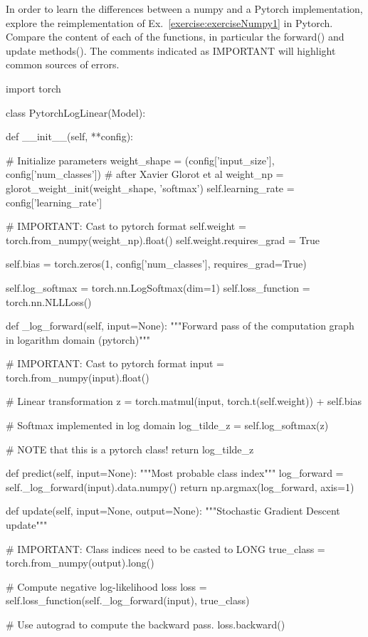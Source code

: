 \begin{exercise}
\label{exercisePytorch1}
In order to learn the differences between a numpy and a Pytorch implementation, explore the reimplementation of Ex.~\ref{exercise:exerciseNumpy1} in Pytorch. Compare the content of each of the functions, in particular the forward() and update methods(). The comments indicated as IMPORTANT will highlight common sources of errors.
\begin{python}
import torch


class PytorchLogLinear(Model):

	def __init__(self, **config):

		# Initialize parameters
		weight_shape = (config['input_size'], config['num_classes'])
		# after Xavier Glorot et al
		weight_np = glorot_weight_init(weight_shape, 'softmax')
		self.learning_rate = config['learning_rate']

		# IMPORTANT: Cast to pytorch format
		self.weight = torch.from_numpy(weight_np).float()
		self.weight.requires_grad = True

		self.bias = torch.zeros(1, config['num_classes'], requires_grad=True)

		self.log_softmax = torch.nn.LogSoftmax(dim=1)
		self.loss_function = torch.nn.NLLLoss()

	def _log_forward(self, input=None):
		"""Forward pass of the computation graph in logarithm domain (pytorch)"""

		# IMPORTANT: Cast to pytorch format
		input = torch.from_numpy(input).float()

		# Linear transformation
		z =  torch.matmul(input, torch.t(self.weight)) + self.bias

		# Softmax implemented in log domain
		log_tilde_z = self.log_softmax(z)

		# NOTE that this is a pytorch class!
		return log_tilde_z

	def predict(self, input=None):
		"""Most probable class index"""
		log_forward = self._log_forward(input).data.numpy()
		return np.argmax(log_forward, axis=1)

	def update(self, input=None, output=None):
		"""Stochastic Gradient Descent update"""

		# IMPORTANT: Class indices need to be casted to LONG
		true_class = torch.from_numpy(output).long()

		# Compute negative log-likelihood loss
		loss = self.loss_function(self._log_forward(input), true_class)

		# Use autograd to compute the backward pass.
		loss.backward()


\end{python}
\end{exercise}
